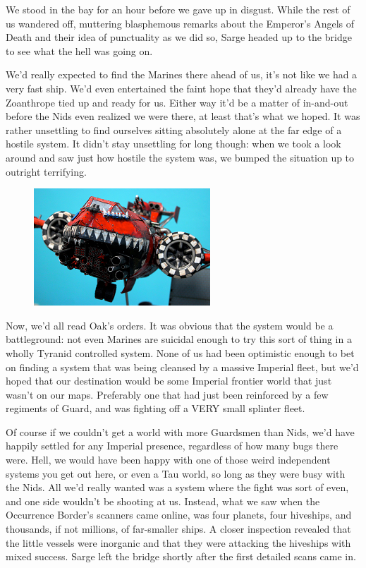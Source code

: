 We stood in the bay for an hour before we gave up in disgust. 
While the rest of us wandered off, muttering blasphemous remarks about the Emperor's Angels of Death and their idea of punctuality as we did so, Sarge headed up to the bridge to see what the hell was going on.

We'd really expected to find the Marines there ahead of us, it's not like we had a very fast ship. 
We'd even entertained the faint hope that they'd already have the Zoanthrope tied up and ready for us. 
Either way it'd be a matter of in-and-out before the Nids even realized we were there, at least that's what we hoped. 
It was rather unsettling to find ourselves sitting absolutely alone at the far edge of a hostile system. 
It didn't stay unsettling for long though: 
when we took a look around and saw just how hostile the system was, we bumped the situation up to outright terrifying.
\begin{figure}
	\begin{center}
		\includegraphics[width=\figwidth]{pics/12/13.png}
	\end{center}
\end{figure}
Now, we'd all read Oak's orders. 
It was obvious that the system would be a battleground: 
not even Marines are suicidal enough to try this sort of thing in a wholly Tyranid controlled system. 
None of us had been optimistic enough to bet on finding a system that was being cleansed by a massive Imperial fleet, but we'd hoped that our destination would be some Imperial frontier world that just wasn't on our maps. 
Preferably one that had just been reinforced by a few regiments of Guard, and was fighting off a VERY small splinter fleet.

Of course if we couldn't get a world with more Guardsmen than Nids, we'd have happily settled for any Imperial presence, regardless of how many bugs there were. 
Hell, we would have been happy with one of those weird independent systems you get out here, or even a Tau world, so long as they were busy with the Nids. 
All we'd really wanted was a system where the fight was sort of even, and one side wouldn't be shooting at us. 
Instead, what we saw when the Occurrence Border's scanners came online, was four planets, four hiveships, and thousands, if not millions, of far-smaller ships. 
A closer inspection revealed that the little vessels were inorganic and that they were attacking the hiveships with mixed success. 
Sarge left the bridge shortly after the first detailed scans came in.

